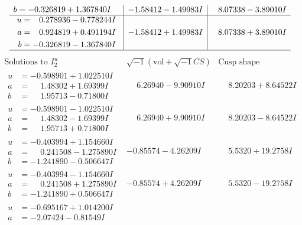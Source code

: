 \documentclass[1p]{elsarticle_modified}
\theoremstyle{definition}
\newcommand{\I}{\sqrt{-1}}
\begin{document}
$$\begin{array}{c|c|c}
\begin{aligned}
b &= -0.326819 + 1.367840 I\end{aligned}
 & -1.58412 - 1.49983 I & \phantom{-}8.07338 - 3.89010 I \\ \hline\begin{aligned}
u &= \phantom{-}0.278936 - 0.778244 I \\
a &= \phantom{-}0.924819 + 0.491194 I \\
b &= -0.326819 - 1.367840 I\end{aligned}
 & -1.58412 + 1.49983 I & \phantom{-}8.07338 + 3.89010 I\\
 \hline 
 \end{array}$$\newpage$$\begin{array}{c|c|c}  
\text{Solutions to }I^u_{2}& \I (\text{vol} + \sqrt{-1}CS) & \text{Cusp shape}\\
 \hline 
\begin{aligned}
u &= -0.598901 + 1.022510 I \\
a &= \phantom{-}1.48302 + 1.69399 I \\
b &= \phantom{-}1.95713 - 0.71800 I\end{aligned}
 & \phantom{-}6.26940 - 9.90910 I & \phantom{-}8.20203 + 8.64522 I \\ \hline\begin{aligned}
u &= -0.598901 - 1.022510 I \\
a &= \phantom{-}1.48302 - 1.69399 I \\
b &= \phantom{-}1.95713 + 0.71800 I\end{aligned}
 & \phantom{-}6.26940 + 9.90910 I & \phantom{-}8.20203 - 8.64522 I \\ \hline\begin{aligned}
u &= -0.403994 + 1.154660 I \\
a &= \phantom{-}0.241508 - 1.275890 I \\
b &= -1.241890 - 0.506647 I\end{aligned}
 & -0.85574 - 4.26209 I & \phantom{-}5.5320 + 19.2758 I \\ \hline\begin{aligned}
u &= -0.403994 - 1.154660 I \\
a &= \phantom{-}0.241508 + 1.275890 I \\
b &= -1.241890 + 0.506647 I\end{aligned}
 & -0.85574 + 4.26209 I & \phantom{-}5.5320 - 19.2758 I \\ \hline\begin{aligned}
u &= -0.695167 + 1.014200 I \\
a &= -2.07424 - 0.81549 I \\

\end{aligned}
\end{array}$$
\end{document}
